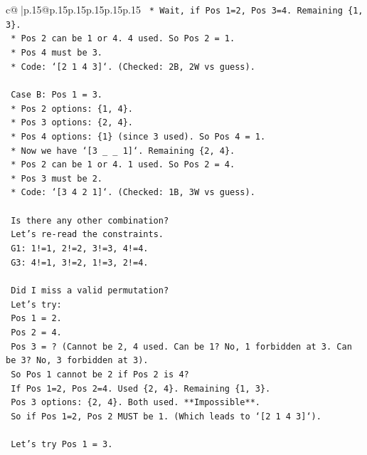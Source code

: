 \documentclass{article}
\begin{document}
{\begin{supertabular}{c@{$\;$}|p{.15\linewidth}@{}p{.15\linewidth}p{.15\linewidth}p{.15\linewidth}p{.15\linewidth}p{.15\linewidth}}
{{{\texttt{        *   Wait, if Pos 1=2, Pos 3=4. Remaining \{1, 3\}.} \\
\texttt{        *   Pos 2 can be 1 or 4. 4 used. So Pos 2 = 1.} \\
\texttt{        *   Pos 4 must be 3.} \\
\texttt{        *   Code: `{[}2 1 4 3{]}`. (Checked: 2B, 2W vs guess).} \\
\\ 
\texttt{    Case B: Pos 1 = 3.} \\
\texttt{    *   Pos 2 options: \{1, 4\}.} \\
\texttt{    *   Pos 3 options: \{2, 4\}.} \\
\texttt{    *   Pos 4 options: \{1\} (since 3 used). So Pos 4 = 1.} \\
\texttt{    *   Now we have `{[}3 \_ \_ 1{]}`. Remaining \{2, 4\}.} \\
\texttt{    *   Pos 2 can be 1 or 4. 1 used. So Pos 2 = 4.} \\
\texttt{    *   Pos 3 must be 2.} \\
\texttt{    *   Code: `{[}3 4 2 1{]}`. (Checked: 1B, 3W vs guess).} \\
\\ 
\texttt{    Is there any other combination?} \\
\texttt{    Let's re{-}read the constraints.} \\
\texttt{    G1: 1!=1, 2!=2, 3!=3, 4!=4.} \\
\texttt{    G3: 4!=1, 3!=2, 1!=3, 2!=4.} \\
\\ 
\texttt{    Did I miss a valid permutation?} \\
\texttt{    Let's try:} \\
\texttt{    Pos 1 = 2.} \\
\texttt{    Pos 2 = 4.} \\
\texttt{    Pos 3 = ? (Cannot be 2, 4 used. Can be 1? No, 1 forbidden at 3. Can be 3? No, 3 forbidden at 3).} \\
\texttt{    So Pos 1 cannot be 2 if Pos 2 is 4?} \\
\texttt{    If Pos 1=2, Pos 2=4. Used \{2, 4\}. Remaining \{1, 3\}.} \\
\texttt{    Pos 3 options: \{2, 4\}. Both used. **Impossible**.} \\
\texttt{    So if Pos 1=2, Pos 2 MUST be 1. (Which leads to `{[}2 1 4 3{]}`).} \\
\\ 
\texttt{    Let's try Pos 1 = 3.} \\
}}}
\end{supertabular}}
\end{document}
